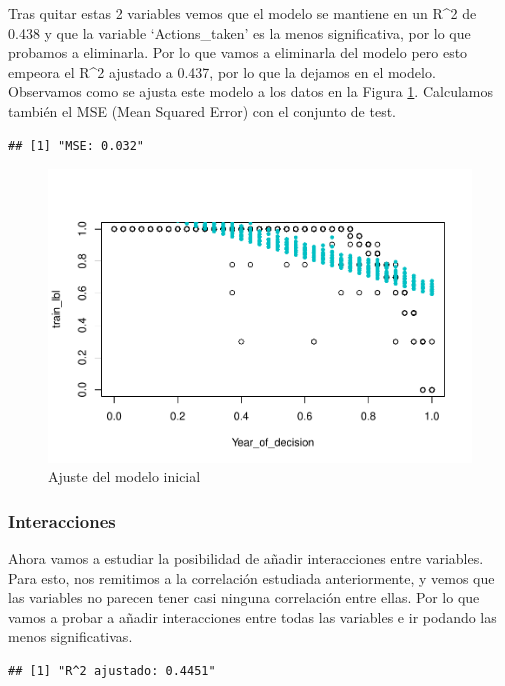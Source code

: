 \documentclass[
]{article}
\begin{document}
Tras quitar estas 2 variables vemos que el modelo se mantiene en un
R\^{}2 de 0.438 y que la variable `Actions\_taken' es la menos
significativa, por lo que probamos a eliminarla. Por lo que vamos a
eliminarla del modelo pero esto empeora el R\^{}2 ajustado a 0.437, por
lo que la dejamos en el modelo. Observamos como se ajusta este modelo a
los datos en la Figura \ref{fig:model_1}. Calculamos también el MSE
(Mean Squared Error) con el conjunto de test.

\begin{verbatim}
## [1] "MSE: 0.032"
\end{verbatim}

\begin{figure}

{\centering \includegraphics[width=0.75\linewidth]{anacalt-regresion_files/figure-latex/model_1-1} 

}

\caption{Ajuste del modelo inicial}\label{fig:model_1}
\end{figure}

\hypertarget{interacciones}{%
\subsubsection{Interacciones}\label{interacciones}}

Ahora vamos a estudiar la posibilidad de añadir interacciones entre
variables. Para esto, nos remitimos a la correlación estudiada
anteriormente, y vemos que las variables no parecen tener casi ninguna
correlación entre ellas. Por lo que vamos a probar a añadir
interacciones entre todas las variables e ir podando las menos
significativas.

\begin{verbatim}
## [1] "R^2 ajustado: 0.4451"
\end{verbatim}
\end{document}
